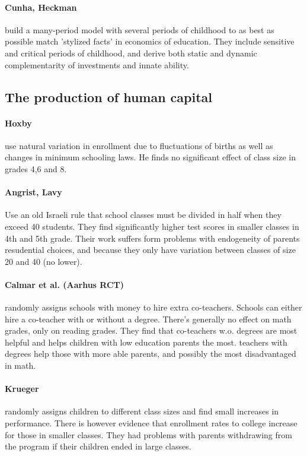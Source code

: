 \documentclass[12pt, a4paper]{article}
\begin{document}
\begin{multicols}{2}
\paragraph{Cunha, Heckman} build a many-period model with several periods of childhood to as best as possible match 'stylized facts' in economics of education. They include sensitive and critical periods of childhood, and derive both static and dynamic complementarity of investments and innate ability.

\subsection{The production of human capital}
\paragraph{Hoxby} use natural variation in enrollment due to fluctuations of births as well as changes in minimum schooling laws. He finds no significant effect of class size in grades 4,6 and 8.

\paragraph{Angrist, Lavy} Use an old Israeli rule that school classes must be divided in half when they exceed 40 students. They find significantly higher test scores in smaller classes in 4th and 5th grade. Their work suffers form problems with endogeneity of parents resudential choices, and because they only have variation between classes of size 20 and 40 (no lower).

\paragraph{Calmar et al. (Aarhus RCT)} randomly assigns schools with money to hire extra co-teachers. Schools can either hire a co-teacher with or without a degree. There's generally no effect on math grades, only on reading grades. They find that co-teachers w.o. degrees are most helpful and helps children with low education parents the most. teachers with degrees help those with more able parents, and possibly the most disadvantaged in math.

\paragraph{Krueger} randomly assigns children to different class sizes and find small increases in performance. There is however evidence that enrollment rates to college increase for those in smaller classes. They had problems with parents withdrawing from the program if their children ended in large classes.


\end{multicols}
\end{document}
